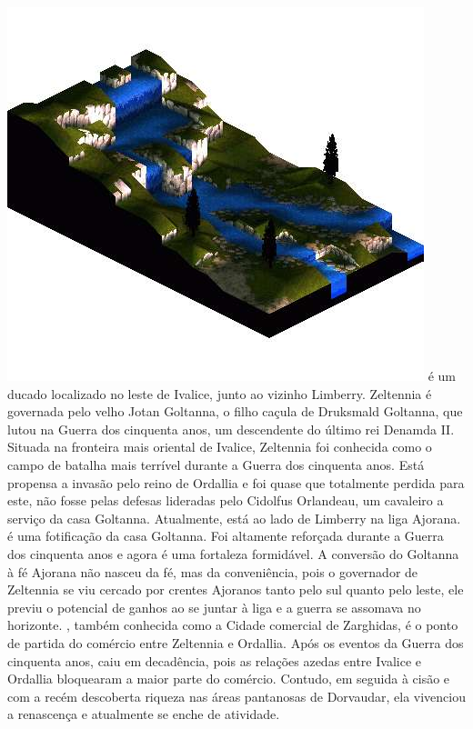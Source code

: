 \includegraphics[width=\columnwidth]{./art/worldbook/finath.jpg}
\newpage
%
 é um ducado localizado no leste de Ivalice, junto ao vizinho Limberry. Zeltennia é governada pelo velho Jotan Goltanna, o filho caçula de Druksmald Goltanna, que lutou na Guerra dos cinquenta anos, um descendente do último rei Denamda II.
Situada na fronteira mais oriental de Ivalice, Zeltennia foi conhecida como o campo de batalha mais terrível durante a Guerra dos cinquenta anos.
Está propensa a invasão pelo reino de Ordallia e foi quase que totalmente perdida para este, não fosse pelas defesas lideradas pelo Cidolfus Orlandeau, um cavaleiro a serviço da casa Goltanna.
Atualmente, está ao lado de Limberry na liga Ajorana.
 é uma fotificação da casa Goltanna. Foi altamente reforçada durante a Guerra dos cinquenta anos e agora é uma fortaleza formidável.
A conversão do Goltanna à fé Ajorana não nasceu da fé, mas da conveniência, pois o governador de Zeltennia se viu cercado por crentes Ajoranos tanto pelo sul quanto pelo leste, ele previu o potencial de ganhos ao se juntar à liga e a guerra se assomava no horizonte.
, também conhecida como a Cidade comercial de Zarghidas, é o ponto de partida do comércio entre Zeltennia e Ordallia.
Após os eventos da Guerra dos cinquenta anos, caiu em decadência, pois as relações azedas entre Ivalice e Ordallia bloquearam a maior parte do comércio. Contudo, em seguida à cisão e com a recém descoberta riqueza nas áreas pantanosas de Dorvaudar, ela vivenciou a renascença e atualmente se enche de atividade. 
